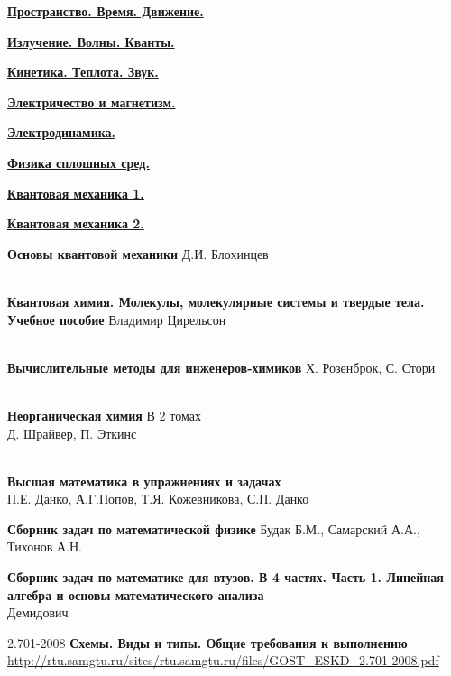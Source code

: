 \begin{thebibliography}{99}
\href{https://drive.google.com/file/d/0B0u4WeMjO894NjRqckpvM19hQVE/view?usp=sharing}{\textbf{Пространство. Время. Движение.}}

 \href{}{\textbf{Излучение. Волны. Кванты.}}

 \href{}{\textbf{Кинетика. Теплота. Звук.}}

\href{https://drive.google.com/file/d/0B0u4WeMjO894dGdvM19ZUTh0UGM/view?usp=sharing}{\textbf{Электричество и магнетизм.}}

 \href{}{\textbf{Электродинамика.}}

 \href{}{\textbf{Физика сплошных сред.}}

 \href{}{\textbf{Квантовая механика 1.}}

 \href{}{\textbf{Квантовая механика 2.}}

\textbf{Основы квантовой механики}
Д.И. Блохинцев


\ \\
\textbf{Квантовая химия. Молекулы, молекулярные системы и твердые тела. Учебное
пособие}
Владимир Цирельсон

\ \\
\textbf{Вычислительные методы для инженеров-химиков}
Х. Розенброк, С. Стори

\ \\
\textbf{Неорганическая химия} В 2 томах\\
Д. Шрайвер, П. Эткинс



\ \\
\textbf{Высшая математика в упражнениях и задачах}\\
П.Е. Данко, А.Г.Попов, Т.Я. Кожевникова, С.П. Данко

\textbf{Сборник задач по математической физике}
Будак Б.М., Самарский А.А., Тихонов А.Н.

\textbf{Сборник задач по математике для втузов. В 4 частях. Часть 1. Линейная
алгебра и основы математического анализа}\\
Демидович


2.701-2008 \textbf{Схемы. Виды и типы. Общие требования к выполнению}\\
\url{http://rtu.samgtu.ru/sites/rtu.samgtu.ru/files/GOST_ESKD_2.701-2008.pdf}

\end{thebibliography}
